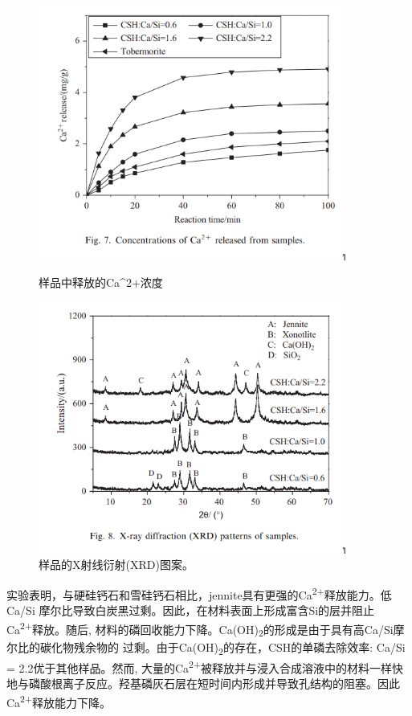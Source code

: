 \documentclass[11pt]{article}
\begin{document}
\begin{figure}
    \centering
    \begin{minipage}{0.45\textwidth}
        \centering
        \includegraphics[width=0.9\textwidth]{fig.7.png} %
        \caption{样品中释放的Ca^{2+}浓度}
    \end{minipage}\hfill
    \begin{minipage}{0.45\textwidth}
        \centering
        \includegraphics[width=0.9\textwidth]{fig.8.png} %
        \caption{样品的X射线衍射(XRD)图案。}
    \end{minipage}
\end{figure}

\setlength{\parindent}{1.0cm}
实验表明，与硬硅钙石和雪硅钙石相比，jennite具有更强的Ca\textsuperscript{2+}释放能力。低Ca/Si
摩尔比导致白炭黑过剩。因此，在材料表面上形成富含Si的层并阻止Ca\textsuperscript{2+}释放。随后,
材料的磷回收能力下降。Ca(OH)\textsubscript{2}的形成是由于具有高Ca/Si摩尔比的碳化物残余物的
过剩。由于Ca(OH)\textsubscript{2}的存在，CSH的单磷去除效率: Ca/Si = 2.2优于其他样品。然而,
大量的Ca\textsuperscript{2+}被释放并与浸入合成溶液中的材料一样快地与磷酸根离子反应。羟基磷灰石层在短时间内形成并导致孔结构的阻塞。因此Ca\textsuperscript{2+}释放能力下降。
\par
\end{document}
